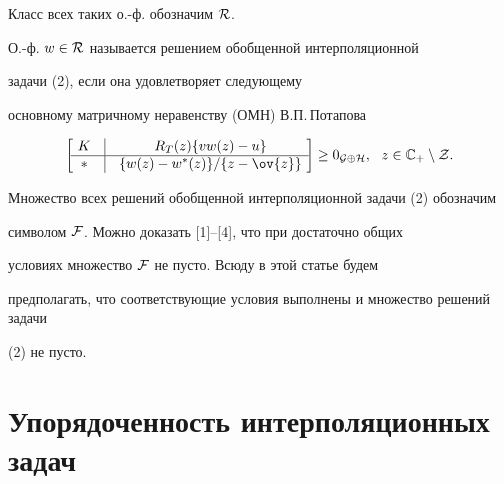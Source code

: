 Класс всех таких о.-ф. обозначим $\cal R$.





\begin{defn}


О.-ф. $w\in \cal R $ называется решением обобщенной интерполяционной


задачи (2), если она удовлетворяет следующему


основному матричному неравенству (ОМН) В.П.\,Потапова


\begin{equation}


\left[\ \begin{matrix}


K & \vline & R_{T}(z)\{vw(z)-u\} \\


\hline


* & \vline & \{w(z)-w^*(z) \} / \{z-\ov{z}\}


\end{matrix}


\ \right]


\geq 0_{{\cal G}\oplus {\cal H}},


\ \ z\in {\Bbb C}_{+}\setminus {\cal Z}.


\end{equation}


\end{defn}





Множество всех решений обобщенной интерполяционной задачи (2) обозначим


символом $\cal F$. Можно доказать [1]--[4], что при достаточно общих


условиях множество $\cal F$ не пусто. Всюду в этой статье будем


предполагать, что соответствующие условия выполнены и множество решений задачи


(2) не пусто.








\section{Упорядоченность интерполяционных задач}





